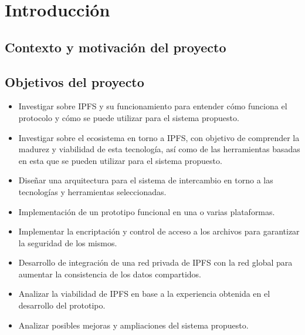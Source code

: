 \chapter{Introducción}
\section{Contexto y motivación del proyecto}
\section{Objetivos del proyecto}
\begin{itemize}

    \item Investigar sobre IPFS y su funcionamiento para entender cómo funciona el protocolo
          y cómo se puede utilizar para el sistema propuesto.
    \item Investigar sobre el ecosistema en torno a IPFS, con objetivo de comprender
          la madurez y viabilidad de esta tecnología, así como de las herramientas basadas en esta
          que se pueden utilizar para el sistema propuesto.
    \item Diseñar una arquitectura para el sistema de intercambio en torno a las tecnologías y herramientas seleccionadas.
    \item Implementación de un prototipo funcional en una o varias plataformas.
    \item Implementar la encriptación y control de acceso a los archivos para garantizar la
          seguridad de los mismos.
    \item Desarrollo de integración de una red privada de IPFS con la red global para
          aumentar la consistencia de los datos compartidos.
    \item Analizar la viabilidad de IPFS en base a la experiencia obtenida en el desarrollo
          del prototipo.
    \item Analizar posibles mejoras y ampliaciones del sistema propuesto.

\end{itemize}

